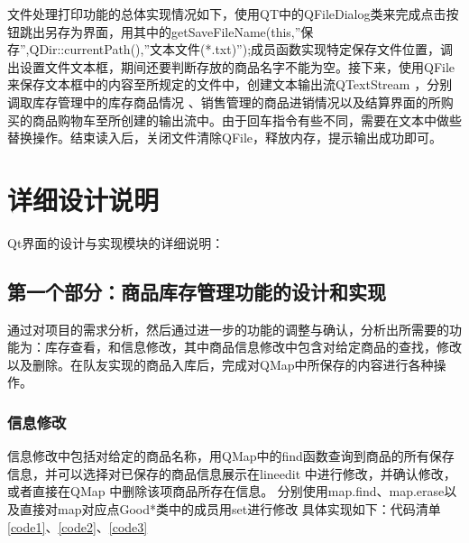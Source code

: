 \documentclass[
   projtype=report, %
   output=print,     %
  ]{nwafuprojrep}
\begin{document}
文件处理打印功能的总体实现情况如下，使用QT中的QFileDialog类来完成点击按钮跳出另存为界面，用其中的getSaveFileName(this,”保存”,QDir::currentPath(),”文本文件(*.txt)”);成员函数实现特定保存文件位置，调出设置文件文本框，期间还要判断存放的商品名字不能为空。接下来，使用QFile来保存文本框中的内容至所规定的文件中，创建文本输出流QTextStream ，分别调取库存管理中的库存商品情况 、销售管理的商品进销情况以及结算界面的所购买的商品购物车至所创建的输出流中。由于回车指令有些不同，需要在文本中做些替换操作。结束读入后，关闭文件清除QFile，释放内存，提示输出成功即可。
\section{详细设计说明}
Qt界面的设计与实现模块的详细说明：
\subsection{第一个部分：商品库存管理功能的设计和实现}
通过对项目的需求分析，然后通过进一步的功能的调整与确认，分析出所需要的功能为：库存查看，和信息修改，其中商品信息修改中包含对给定商品的查找，修改以及删除。在队友实现的商品入库后，完成对QMap中所保存的内容进行各种操作。
\subsubsection{信息修改}
信息修改中包括对给定的商品名称，用QMap中的find函数查询到商品的所有保存信息，并可以选择对已保存的商品信息展示在lineedit 中进行修改，并确认修改，或者直接在QMap 中删除该项商品所存在信息。
分别使用map.find、map.erase以及直接对map对应点Good*类中的成员用set进行修改
具体实现如下：代码清单\ref{code1}、\ref {code2}、\ref{code3}
\end{document}
